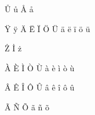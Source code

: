 \documentclass{article}
\begin{document}

\r{U} \r{u} {\AA} {\aa}


\"{Y} \"{y} \"{A} \"{E} \"{I} \"{O} \"{U} \"{a} \"{e} \"{i} \"{o} \"{u}


\.{Z} \.{I} \.{z} 


\`{A} \`{E} \`{I} \`{O} \`{U} \`{a} \`{e} \`{i} \`{o} \`{u}


\^{A} \^{E} \^{I} \^{O} \^{U} \^{a} \^{e} \^{i} \^{o} \^{u}


\~{A} \~{N} \~{O} \~{a} \~{n} \~{o}
\end{document}
